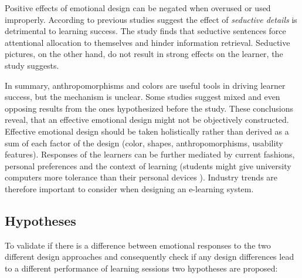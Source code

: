 		
		Positive effects of emotional design can be negated when overused or used improperly. According to \cite{Chang2014} previous studies suggest the effect of \textit{seductive details} is detrimental to learning success. The study finds that seductive sentences force attentional allocation to themselves and hinder information retrieval. Seductive pictures, on the other hand, do not result in strong effects on the learner, the study suggests.
		
		In summary, anthropomorphisms and colors are useful tools in driving learner success, but the mechanism is unclear. Some studies suggest mixed and even opposing results from the ones hypothesized before the study. These conclusions reveal, that an effective emotional design might not be objectively constructed. Effective emotional design should be taken holistically rather than derived as a sum of each factor of the design (color, shapes, anthropomorphisms, usability features). Responses of the learners can be further mediated by current fashions, personal preferences and the context of learning (students might give university computers more tolerance than their personal devices \cite{Heidig2015}). Industry trends are therefore important to consider when designing an e-learning system.
		
		
	
	\subsection{Hypotheses} \label{sec:hypothesis}
	
		To validate if there is a difference between emotional responses to the two different design approaches and consequently check if any design differences lead to a different performance of learning sessions two hypotheses are proposed:
	
